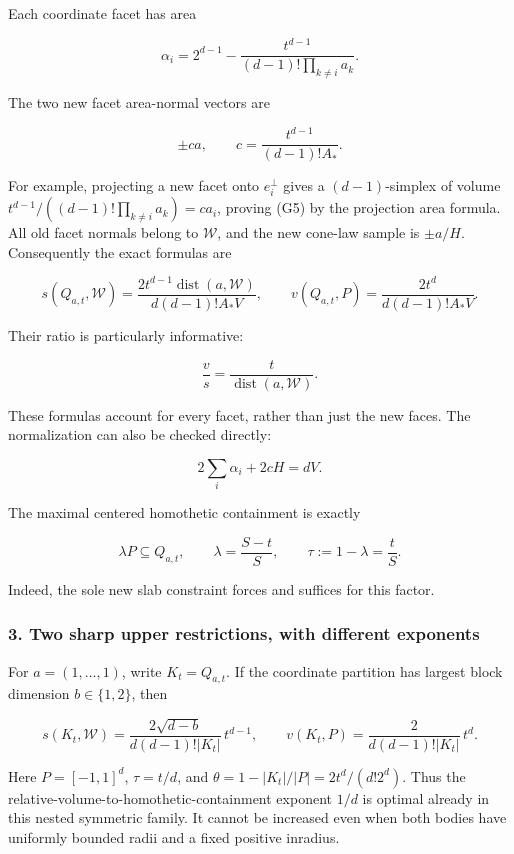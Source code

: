 \documentclass[
  11pt,
]{article}
\begin{document}
Each coordinate facet has area

\[
\alpha_i=2^{d-1}-\frac{t^{d-1}}{(d-1)!\prod_{k\ne i}a_k}.
\]

The two new facet area-normal vectors are

\[
\pm c a,\qquad c=\frac{t^{d-1}}{(d-1)!A_*}.                \tag{G5}
\]

For example, projecting a new facet onto \(e_i^\perp\) gives a
\((d-1)\)-simplex of volume \(t^{d-1}/((d-1)!\prod_{k\ne i}a_k)=ca_i\),
proving (G5) by the projection area formula. All old facet normals
belong to \(\mathcal W\), and the new cone-law sample is \(\pm a/H\).
Consequently the exact formulas are

\[
\boxed{
s(Q_{a,t},\mathcal W)
 =\frac{2t^{d-1}\operatorname{dist}(a,\mathcal W)}
        {d(d-1)!A_* V},\qquad
v(Q_{a,t},P)=\frac{2t^d}{d(d-1)!A_* V}.
}                                                        \tag{G6}
\]

Their ratio is particularly informative:

\[
\frac{v}{s}=\frac{t}{\operatorname{dist}(a,\mathcal W)}.     \tag{G7}
\]

These formulas account for every facet, rather than just the new faces.
The normalization can also be checked directly:

\[
2\sum_i\alpha_i+2cH=dV.
\]

The maximal centered homothetic containment is exactly

\[
\lambda P\subseteq Q_{a,t},\qquad
\lambda=\frac{S-t}{S},\qquad \tau:=1-\lambda=\frac tS.     \tag{G8}
\]

Indeed, the sole new slab constraint forces and suffices for this
factor.

\subsubsection{3. Two sharp upper restrictions, with different
exponents}\label{two-sharp-upper-restrictions-with-different-exponents}

For \(a=(1,\ldots,1)\), write \(K_t=Q_{a,t}\). If the coordinate
partition has largest block dimension \(b\in\{1,2\}\), then

\[
s(K_t,\mathcal W)=
\frac{2\sqrt{d-b}}{d(d-1)!|K_t|}\,t^{d-1},\qquad
v(K_t,P)=\frac{2}{d(d-1)!|K_t|}\,t^d.                     \tag{G9}
\]

Here \(P=[-1,1]^d\), \(\tau=t/d\), and
\(\theta=1-|K_t|/|P|=2t^d/(d!2^d)\). Thus the
relative-volume-to-homothetic-containment exponent \(1/d\) is optimal
already in this nested symmetric family. It cannot be increased even
when both bodies have uniformly bounded radii and a fixed positive
inradius.
\end{document}

